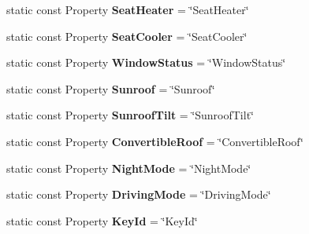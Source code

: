 \begin{DoxyCompactItemize}
\item 
\hypertarget{classVehicleProperty_aaf891a6fb7485be67ab8dfae96636076}{static const Property {\bfseries Seat\-Heater} = \char`\"{}Seat\-Heater\char`\"{}}\label{classVehicleProperty_aaf891a6fb7485be67ab8dfae96636076}

\item 
\hypertarget{classVehicleProperty_aa5ccd72b6b86bd1741d05281fb0490c6}{static const Property {\bfseries Seat\-Cooler} = \char`\"{}Seat\-Cooler\char`\"{}}\label{classVehicleProperty_aa5ccd72b6b86bd1741d05281fb0490c6}

\item 
\hypertarget{classVehicleProperty_aafce44d9eb4eb200970bf1146cdd77d3}{static const Property {\bfseries Window\-Status} = \char`\"{}Window\-Status\char`\"{}}\label{classVehicleProperty_aafce44d9eb4eb200970bf1146cdd77d3}

\item 
\hypertarget{classVehicleProperty_ae7498970718f7bf52ef6a5800084b91b}{static const Property {\bfseries Sunroof} = \char`\"{}Sunroof\char`\"{}}\label{classVehicleProperty_ae7498970718f7bf52ef6a5800084b91b}

\item 
\hypertarget{classVehicleProperty_aaa5b7fe1aa9c1df58285370a2223a9a7}{static const Property {\bfseries Sunroof\-Tilt} = \char`\"{}Sunroof\-Tilt\char`\"{}}\label{classVehicleProperty_aaa5b7fe1aa9c1df58285370a2223a9a7}

\item 
\hypertarget{classVehicleProperty_ac81ed60b4ae5140288191380470aa6fe}{static const Property {\bfseries Convertible\-Roof} = \char`\"{}Convertible\-Roof\char`\"{}}\label{classVehicleProperty_ac81ed60b4ae5140288191380470aa6fe}

\item 
\hypertarget{classVehicleProperty_af85dc0e35b81d1ce30818c0dc2cbde94}{static const Property {\bfseries Night\-Mode} = \char`\"{}Night\-Mode\char`\"{}}\label{classVehicleProperty_af85dc0e35b81d1ce30818c0dc2cbde94}

\item 
\hypertarget{classVehicleProperty_a4b68af6a7539a07a2be7438bd6ced9f0}{static const Property {\bfseries Driving\-Mode} = \char`\"{}Driving\-Mode\char`\"{}}\label{classVehicleProperty_a4b68af6a7539a07a2be7438bd6ced9f0}

\item 
\hypertarget{classVehicleProperty_ab4e37b9cd6be99aa50f009cf8b26f8ae}{static const Property {\bfseries Key\-Id} = \char`\"{}Key\-Id\char`\"{}}\label{classVehicleProperty_ab4e37b9cd6be99aa50f009cf8b26f8ae}


\end{DoxyCompactItemize}
